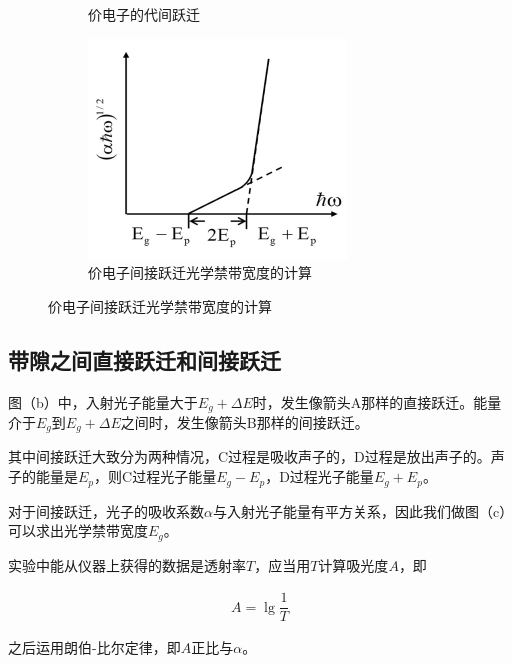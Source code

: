\documentclass{article}
\begin{document}
\begin{figure}[H]
\begin{subfigure}{.35\textwidth}
    \caption{价电子的代间跃迁}
  \end{subfigure}
    \begin{subfigure}{.35\textwidth}
    \centering
    \includegraphics[width=\linewidth]{figures/间接跃迁情况下吸收系数}
    \caption{价电子间接跃迁光学禁带宽度的计算}
  \end{subfigure}
\end{figure}

\subsection{带隙之间直接跃迁和间接跃迁}

图（b）中，入射光子能量大于$E_g + \Delta E$时，发生像箭头A那样的直接跃迁。能量介于$E_g$到$E_g + \Delta E$之间时，发生像箭头B那样的间接跃迁。

其中间接跃迁大致分为两种情况，C过程是吸收声子的，D过程是放出声子的。声子的能量是$E_p$，则C过程光子能量$E_g - E_p$，D过程光子能量$E_g + E_p$。

对于间接跃迁，光子的吸收系数$\alpha$与入射光子能量有平方关系，因此我们做图（c）可以求出光学禁带宽度$E_g$。

实验中能从仪器上获得的数据是透射率$T$，应当用$T$计算吸光度$A$，即

\begin{equation*}
  \begin{aligned}
    A = \lg \dfrac{1}{T} 
  \end{aligned}
\end{equation*}

之后运用朗伯-比尔定律，即$A$正比与$\alpha$。
 
\end{document}
